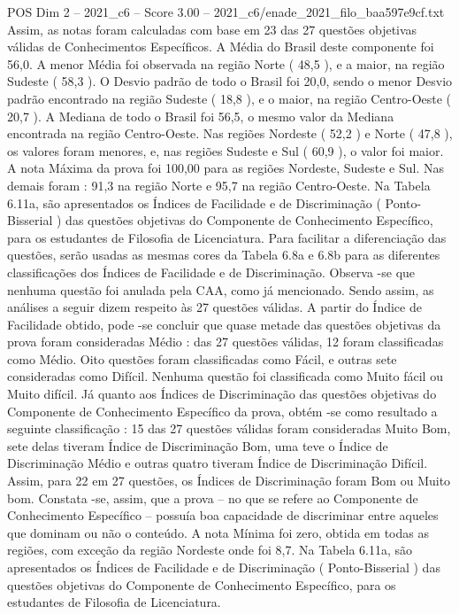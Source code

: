 \begin{textsample}{POS Dim 2 – 2021\_c6 – Score 3.00 – 2021\_c6/enade\_2021\_filo\_baa597e9cf.txt}
Assim, as notas foram calculadas com base em 23 das 27 questões objetivas válidas de Conhecimentos Específicos.
A Média do Brasil deste componente foi 56,0.
A menor Média foi observada na região Norte ( 48,5 ), e a maior, na região Sudeste ( 58,3 ).
O Desvio padrão de todo o Brasil foi 20,0, sendo o menor Desvio padrão encontrado na região Sudeste ( 18,8 ), e o maior, na região Centro-Oeste ( 20,7 ).
A Mediana de todo o Brasil foi 56,5, o mesmo valor da Mediana encontrada na região Centro-Oeste.
Nas regiões Nordeste ( 52,2 ) e Norte ( 47,8 ), os valores foram menores, e, nas regiões Sudeste e Sul ( 60,9 ), o valor foi maior.
A nota Máxima da prova foi 100,00 para as regiões Nordeste, Sudeste e Sul.
Nas demais foram : 91,3 na região Norte e 95,7 na região Centro-Oeste.
Na Tabela 6.11a, são apresentados os Índices de Facilidade e de Discriminação ( Ponto-Bisserial ) das questões objetivas do Componente de Conhecimento Específico, para os estudantes de Filosofia de Licenciatura.
Para facilitar a diferenciação das questões, serão usadas as mesmas cores da Tabela 6.8a e 6.8b para as diferentes classificações dos Índices de Facilidade e de Discriminação.
Observa -se que nenhuma questão foi anulada pela CAA, como já mencionado.
Sendo assim, as análises a seguir dizem respeito às 27 questões válidas.
A partir do Índice de Facilidade obtido, pode -se concluir que quase metade das questões objetivas da prova foram consideradas Médio : das 27 questões válidas, 12 foram classificadas como Médio.
Oito questões foram classificadas como Fácil, e outras sete consideradas como Difícil.
Nenhuma questão foi classificada como Muito fácil ou Muito difícil.
Já quanto aos Índices de Discriminação das questões objetivas do Componente de Conhecimento Específico da prova, obtém -se como resultado a seguinte classificação : 15 das 27 questões válidas foram consideradas Muito Bom, sete delas tiveram Índice de Discriminação Bom, uma teve o Índice de Discriminação Médio e outras quatro tiveram Índice de Discriminação Difícil.
Assim, para 22 em 27 questões, os Índices de Discriminação foram Bom ou Muito bom.
Constata -se, assim, que a prova – no que se refere ao Componente de Conhecimento Específico – possuía boa capacidade de discriminar entre aqueles que dominam ou não o conteúdo.
A nota Mínima foi zero, obtida em todas as regiões, com exceção da região Nordeste onde foi 8,7.
Na Tabela 6.11a, são apresentados os Índices de Facilidade e de Discriminação ( Ponto-Bisserial ) das questões objetivas do Componente de Conhecimento Específico, para os estudantes de Filosofia de Licenciatura.

\end{textsample}
